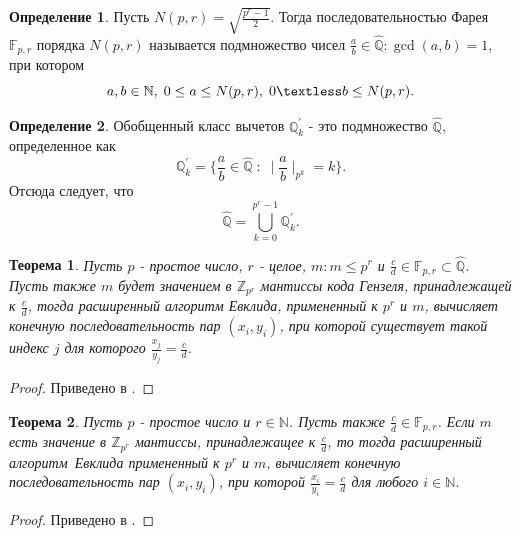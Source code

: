 \documentclass[master, och, diploma, times]{sty/SCWorks}
\theoremstyle{plain}
\newtheorem{thethm}{Теорема}[section]
\theoremstyle{definition}
\newtheorem{defn}{Определение}[section]
\numberwithin{equation}{section}
\begin{document}
\begin{defn}\label{def:farey}
Пусть $N(p, r)=\sqrt{\frac{p^r-1}{2}}$. Тогда последовательностью Фарея $\mathbb{F}_{p,r}$ порядка $N(p, r)$ называется подмножество чисел $\frac{a}{b} \in \hat{\mathbb{Q}}: \gcd{(a,b)}=1$, при котором
\begin{equation}
a, b \in \mathbb{N}, \; 0 \leq a \leq N(p, r), \; 0 \textless b \leq N(p, r).
\end{equation}
\end{defn}


\begin{defn}\label{def:qhat}
Обобщенный класс вычетов $\mathbb{Q}_k^{'}$ - это подмножество $\hat{\mathbb{Q}}$, определенное как
\begin{equation}
\mathbb{Q}_k^{'}=\bigg \{ \frac{a}{b} \in \hat{\mathbb{Q}} \; : \; \mid \frac{a}{b} \mid_{p^k}=k \bigg \}.
\end{equation}
Отсюда следует, что
\begin{equation}
\hat{\mathbb{Q}} = \bigcup\limits_{k=0}^{p^r-1} \mathbb{Q}_k^{'}.
\end{equation}
\end{defn}


\begin{thethm}\label{th:backward_mapping}
Пусть $p$ - простое число, $r$ - целое, $m: m \leq p^r$ и $\frac{c}{d} \in \mathbb{F}_{p,r} \subset \hat{\mathbb{Q}}$. Пусть также $m$ будет значением в $\mathbb{Z}_{p^r}$ мантиссы кода Гензеля, принадлежащей к $\frac{c}{d}$, тогда расширенный алгоритм Евклида, примененный к $p^r$ и $m$, вычисляет конечную последовательность пар $(x_i, y_i)$, при которой существует такой индекс $j$ для которого $\frac{x_j}{y_j}=\frac{c}{d}$.
\end{thethm}

\begin{proof} 
Приведено в \cite{bib:numbers:miola}.
\end{proof}

\begin{thethm}
Пусть $p$ - простое число и $r \in \mathbb{N}$. Пусть также $\frac{c}{d} \in \mathbb{F}_{p,r}$. Если $m$ есть значение в $\mathbb{Z}_{p^r}$ мантиссы, принадлежащее к $\frac{c}{d}$, то тогда \mbox{расширенный} \mbox{алгоритм Евклида} примененный к $p^r$ и $m$, вычисляет конечную последовательность пар $(x_i, y_i)$, при которой $\frac{x_i}{y_i}=\frac{c}{d}$ для любого $i \in \mathbb{N}$.
\end{thethm}

\begin{proof} 
Приведено в \cite{bib:numbers:miola}.
\end{proof}
\end{document}
